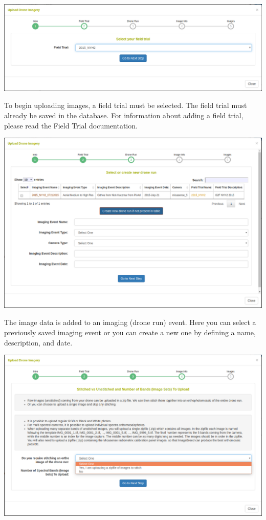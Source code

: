 \documentclass[
  12pt,
]{book}
\begin{document}
\begin{center}\includegraphics[width=0.95\linewidth]{assets/images/manage_image_phenotyping_upload_field_trial} \end{center}

To begin uploading images, a field trial must be selected. The field trial must already be saved in the database. For information about adding a field trial, please read the Field Trial documentation.

\begin{center}\includegraphics[width=0.95\linewidth]{assets/images/manage_image_phenotyping_upload_drone_run} \end{center}

The image data is added to an imaging (drone run) event. Here you can select a previously saved imaging event or you can create a new one by defining a name, description, and date.

\begin{center}\includegraphics[width=0.95\linewidth]{assets/images/manage_image_phenotyping_upload_image_info_1} \end{center}
\end{document}
